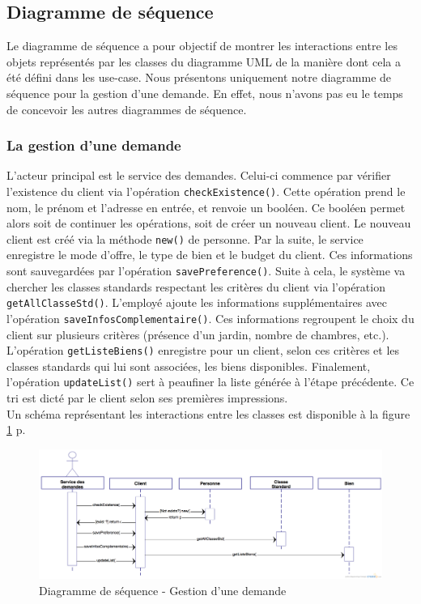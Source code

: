 \subsection{Diagramme de séquence}
Le diagramme de séquence a pour objectif de montrer les interactions entre les objets représentés par les classes du diagramme UML de la manière dont cela a été défini dans les use-case.
Nous présentons uniquement notre diagramme de séquence pour la gestion d'une demande.
En effet, nous n'avons pas eu le temps de concevoir les autres diagrammes de séquence.

\subsubsection{La gestion d'une demande}
L'acteur principal est le service des demandes. 
Celui-ci commence par vérifier l'existence du client via l'opération \texttt{checkExistence()}.
Cette opération prend le nom, le prénom et l'adresse en entrée, et renvoie un booléen.
Ce booléen permet alors soit de continuer les opérations, soit de créer un nouveau client.
Le nouveau client est créé via la méthode \texttt{new()} de personne.
Par la suite, le service enregistre le mode d'offre, le type de bien et le budget du client.
Ces informations sont sauvegardées par l'opération \texttt{savePreference()}.
Suite à cela, le système va chercher les classes standards respectant les critères du client via l'opération \texttt{getAllClasseStd()}.
L'employé ajoute les informations supplémentaires avec l'opération \texttt{saveInfosComplementaire()}.
Ces informations regroupent le choix du client sur plusieurs critères (présence d'un jardin, nombre de chambres, etc.).
L'opération \texttt{getListeBiens()} enregistre pour un client, selon ces critères et les classes standards qui lui sont associées, les biens disponibles.
Finalement, l'opération \texttt{updateList()} sert à peaufiner la liste générée à l'étape précédente.
Ce tri est dicté par le client selon ses premières impressions.\\

Un schéma représentant les interactions entre les classes est disponible à la figure \ref{fig:sequence} p.\pageref{fig:sequence}

\newpage
\begin{landscape}
	\begin{figure}
		\centering
		\includegraphics[width=23cm]{Sequence-DemandeBien.png}
		\caption{Diagramme de séquence - Gestion d'une demande}
		\label{fig:sequence}
	\end{figure}	 
\end{landscape}